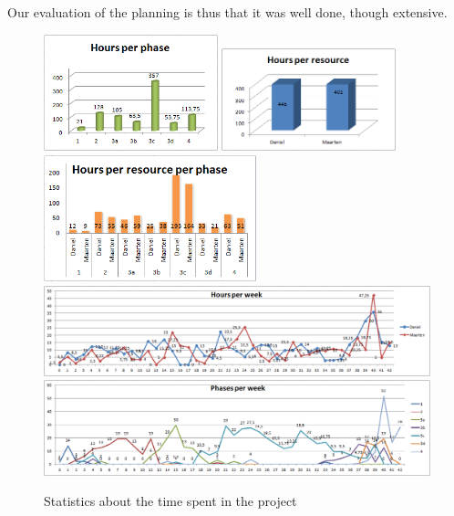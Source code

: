 Our evaluation of the planning is thus that it was well done, though extensive.
%
\begin{figure}[htb!]
	\centering
	\includegraphics[width=0.45\textwidth]{Figures/HoursPerPhase}
	\includegraphics[width=0.45\textwidth]{Figures/HoursPerResource}
	\includegraphics[width=0.55\textwidth]{Figures/HoursPerResourcePerPhase}
	\includegraphics[width=1.00\textwidth]{Figures/HoursPerWeek}
	\includegraphics[width=1.00\textwidth]{Figures/HoursPerPhasePerWeek}
	\caption{Statistics about the time spent in the project}
	\label{fig:hour-statistics}
\end{figure}
